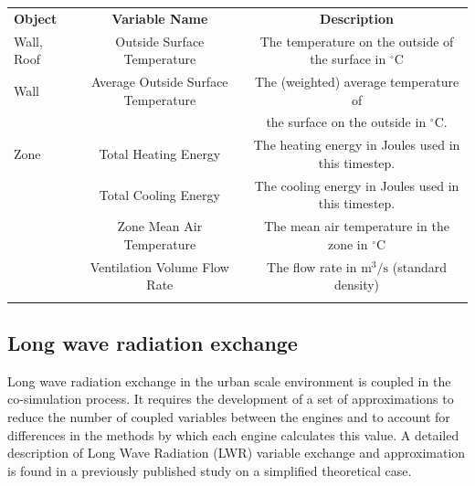 \documentclass{tBPS2e}
\theoremstyle{plain}
\theoremstyle{definition}
\theoremstyle{remark}
\newcommand{\noteDT}[1]{\footnote{\textcolor{green}{#1}}}
\begin{document}

\begin{table}[H]
{\begin{tabular}[l]{@{}lcc}\toprule
  \bf{Object} &  \bf{Variable Name} & \bf{Description} \\
\colrule
Wall, Roof & Outside Surface Temperature & The temperature on the outside of the surface in $^{\circ}\mathrm{C}$ \\    
    \hline
Wall & Average Outside Surface Temperature & The (weighted) average temperature of \\
& & the surface on the outside in $^{\circ}\mathrm{C}$. \\
    \hline
Zone & Total Heating Energy & The heating energy in Joules used in this timestep. \\
& Total Cooling Energy & The cooling energy in Joules used in this timestep. \\
& Zone Mean Air Temperature & The mean air temperature in the zone in $^{\circ}\mathrm{C}$ \\
& Ventilation Volume Flow Rate & The flow rate in $\mathrm{m}^3/\mathrm{s}$ (standard density) \\
\botrule
\end{tabular}}
\label{FMUexports}
\end{table}

\subsection{Long wave radiation exchange}
\label{lwradiation}
Long wave radiation exchange in the urban scale environment is coupled in the
co-simulation process. It requires the development of a set of
approximations to reduce the number of coupled variables between the engines
and to account for differences in the methods by which each engine calculates
this value. A detailed description of Long Wave Radiation (LWR) variable
exchange and approximation is found in a previously published study
\citep{Miller:2015vk} on a simplified theoretical case.
\end{document}
